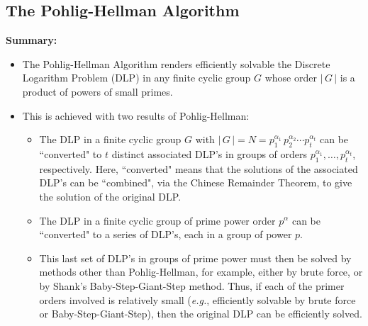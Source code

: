 \clearpage
\subsection{The Pohlig-Hellman Algorithm}

\noindent
\textbf{Summary:}
\begin{itemize}
\item	The Pohlig-Hellman Algorithm renders efficiently solvable the Discrete Logarithm Problem (DLP) in any
		finite cyclic group $G$ whose order $\vert\,G\,\vert$ is a product of powers of small primes.
\item	This is achieved with two results of Pohlig-Hellman:
		\begin{itemize}
		\item	The DLP in a finite cyclic group $G$ with
				$\vert\,G\,\vert = N = p_{1}^{\alpha_{1}}\,p_{2}^{\alpha_{2}} \cdots p_{t}^{\alpha_{t}}$
				can be ``converted" to $t$ distinct associated DLP's in groups of orders
				$p_{1}^{\alpha_{1}}, \ldots, p_{t}^{\alpha_{t}}$, respectively.
				Here, ``converted" means that the solutions of the associated DLP's can be ``combined",
				via the Chinese Remainder Theorem, to give the solution of the original DLP.
		\item	The DLP in a finite cyclic group of prime power order $p^{\alpha}$ can be ``converted" to
				a series of DLP's, each in a group of power $p$.
		\item	This last set of DLP's in groups of prime power must then be solved by methods other than
				Pohlig-Hellman, for example, either by brute force, or by Shank's Baby-Step-Giant-Step method.
				Thus, if each of the primer orders involved is relatively small
				(\textit{e.g.}, efficiently solvable by brute force or Baby-Step-Giant-Step),
				then the original DLP can be efficiently solved.
		\end{itemize}
\end{itemize}

